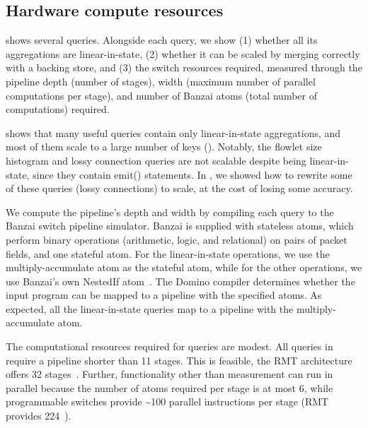 \subsection{Hardware compute resources}
\label{s:eval:hardware}
\label{sec:eval:hardware}

 shows several \TheSystem queries. Alongside each
query, we show (1) whether all its aggregations are linear-in-state, (2)
whether it can be scaled by merging correctly with a backing store, and (3) the
switch resources required, measured through the pipeline depth (number of
stages), width (maximum number of parallel computations per stage), and
number of Banzai atoms (total number of computations) required.
%
%

 shows that many useful queries contain only
linear-in-state aggregations, and most of them scale to a large number of keys
(). Notably, the flowlet size histogram and
lossy connection queries are not scalable despite being linear-in-state, since
they contain {\ct emit()} statements.  In , we
showed how to rewrite some of these queries (\eg lossy connections) to scale, at
the cost of losing some accuracy.

We compute the pipeline's depth and width by compiling each query to the Banzai
switch pipeline simulator. Banzai is supplied
with stateless atoms, which perform binary operations (arithmetic, logic, and
relational) on pairs of packet fields, and one stateful atom. For the
linear-in-state operations, we use the multiply-accumulate atom as the stateful
atom, while for the other operations, we use Banzai's own NestedIf atom~\cite{domino_sigcomm}. The Domino compiler determines whether the input
program can be mapped to a pipeline with the specified atoms. As expected, all
the linear-in-state queries map to a pipeline with the multiply-accumulate
atom.

The computational resources required for \TheSystem queries are modest.  All
queries in  require a pipeline shorter than 11 stages.
This is feasible, \eg the
RMT architecture offers 32 stages~\cite{rmt}. Further, functionality other than
measurement can run in parallel
because the number of atoms required per stage is at most 6, while
programmable switches provide \textasciitilde{}100 parallel instructions per stage
(\eg RMT provides 224~\cite{rmt}).

